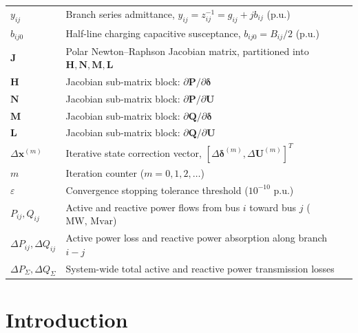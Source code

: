 \documentclass[12pt,a4paper,oneside]{report}
\begin{document}
\begin{longtable}{ll}
$y_{ij}$ & Branch series admittance, $y_{ij} = z_{ij}^{-1} = g_{ij} + jb_{ij}$ ($\text{p.u.}$) \\
$b_{ij0}$ & Half-line charging capacitive susceptance, $b_{ij0} = B_{ij}/2$ ($\text{p.u.}$) \\
$\mathbf{J}$ & Polar Newton--Raphson Jacobian matrix, partitioned into $\mathbf{H}, \mathbf{N}, \mathbf{M}, \mathbf{L}$ \\
$\mathbf{H}$ & Jacobian sub-matrix block: $\partial \mathbf{P} / \partial \boldsymbol{\delta}$ \\
$\mathbf{N}$ & Jacobian sub-matrix block: $\partial \mathbf{P} / \partial \mathbf{U}$ \\
$\mathbf{M}$ & Jacobian sub-matrix block: $\partial \mathbf{Q} / \partial \boldsymbol{\delta}$ \\
$\mathbf{L}$ & Jacobian sub-matrix block: $\partial \mathbf{Q} / \partial \mathbf{U}$ \\
$\Delta \mathbf{x}^{(m)}$ & Iterative state correction vector, $[\Delta \boldsymbol{\delta}^{(m)}, \Delta \mathbf{U}^{(m)}]^T$ \\
$m$ & Iteration counter ($m = 0, 1, 2, \dots$) \\
$\varepsilon$ & Convergence stopping tolerance threshold ($10^{-10}\text{ p.u.}$) \\
$P_{ij}, Q_{ij}$ & Active and reactive power flows from bus $i$ toward bus $j$ ($\text{MW, Mvar}$) \\
$\Delta P_{ij}, \Delta Q_{ij}$ & Active power loss and reactive power absorption along branch $i-j$ \\
$\Delta P_{\Sigma}, \Delta Q_{\Sigma}$ & System-wide total active and reactive power transmission losses \\
\bottomrule
\end{longtable}

\clearpage

\tableofcontents
\clearpage
\listoftables
\clearpage
\listoffigures
\clearpage


\chapter{Introduction}
\end{document}
